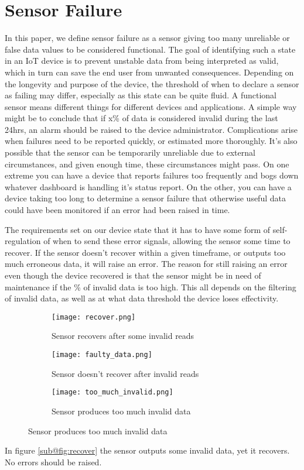 \section{Sensor Failure}
In this paper, we define sensor failure as a sensor giving too many unreliable or false data values to be considered functional. The goal of identifying such a state in an IoT device is to prevent unstable data from being interpreted as valid, which in turn can save the end user from unwanted consequences. Depending on the longevity and purpose of the device, the threshold of when to declare a sensor as failing may differ, especially as this state can be quite fluid. A functional sensor means different things for different devices and applications. A simple way might be to conclude that if x\% of data is considered invalid during the last 24hrs, an alarm should be raised to the device administrator. Complications arise when failures need to be reported quickly, or estimated more thoroughly. It's also possible that the sensor can be temporarily unreliable due to external circumstances, and given enough time, these circumstances might pass. On one extreme you can have a device that reports failures too frequently and bogs down whatever dashboard is handling it's status report. On the other, you can have a device taking too long to determine a sensor failure that otherwise useful data could have been monitored if an error had been raised in time.

The requirements set on our device state that it has to have some form of self-regulation of when to send these error signals, allowing the sensor some time to recover. If the sensor doesn't recover within a given timeframe, or outputs too much erroneous data, it will raise an error. The reason for still raising an error even though the device recovered is that the sensor might be in need of maintenance if the \% of invalid data is too high. This all depends on the filtering of invalid data, as well as at what data threshold the device loses effectivity.

\begin{figure}[H]
\centering
	\begin{subfigure}[b]{0.3\textwidth}
    \texttt{[image: recover.png]}
    \caption{Sensor recovers after some invalid reads}
    \label{fig:recover}
	\end{subfigure}
	\begin{subfigure}[b]{0.3\textwidth}
    \texttt{[image: faulty\_data.png]}
    \caption{Sensor doesn't recover after invalid reads}
    \label{fig:no_recover}
	\end{subfigure}
	\begin{subfigure}[b]{0.3\textwidth}
    \texttt{[image: too\_much\_invalid.png]}
    \caption{Sensor produces too much invalid data}
    \label{fig:too_much_invalid}
	\end{subfigure}
\end{figure}
In figure \ref{sub@fig:recover} the sensor outputs some invalid data, yet it recovers. No errors should be raised.

